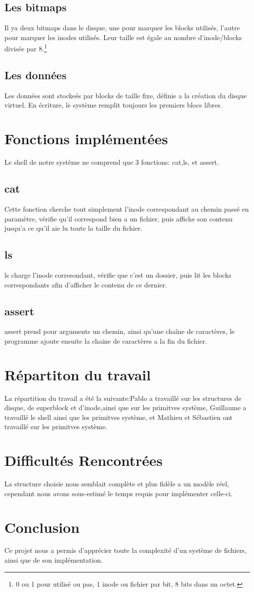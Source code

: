 \documentclass{report}
\begin{document}
\subsection*{Les bitmaps}
Il ya deux bitmaps dans le disque, une pour marquer les blocks utilisés, l'autre pour marquer les inodes utilisés. Leur taille est égale au nombre d'inode/blocks divisée par 8.\footnote{0 ou 1 pour utilisé ou pas, 1 inode ou fichier par bit, 8 bits dans un octet.}
\subsection*{Les données}
Les données sont stockeés par blocks de taille fixe, définie a la création du disque virtuel. En écriture, le système remplit toujours les premiers blocs libres.

\section*{Fonctions implémentées}
Le shell de notre système ne comprend que 3 fonctions: cat,ls, et assert.
\subsection*{cat}
Cette fonction cherche tout simplement l'inode correspondant au chemin passé en paramètre, vérifie qu'il correspond bien a un fichier, puis affiche son contenu jusqu'a ce qu'il aie lu toute la taille du fichier.
\subsection*{ls}
ls charge l'inode corresondant, vérifie que c'est un dossier, puis lit les blocks correspondants afin d'afficher le contenu de ce dernier.
\subsection*{assert}
assert prend pour arguments un chemin, ainsi qu'une chaîne de caractères, le programme ajoute ensuite la chaine de caractères a la fin du fichier.

\section*{Répartiton du travail}
La répartition du travail a été la suivante:Pablo a travaillé sur les structures de disque, de superblock et d'inode,ainsi que sur les primitves système, Guillaume a travaillé le shell ainsi que les primitves système, et Mathieu et Sébastien ont travaillé sur les primitves système.

\section*{Difficultés Rencontrées}
La structure choisie nous semblait complète et plus fidèle a un modèle réel, cependant nous avons sous-estimé le temps requis pour implémenter celle-ci.
\section*{Conclusion}
Ce projet nous a permis d'apprécier toute la complexité d'un système de fichiers, ainsi que de son implémentation.
\end{document}
